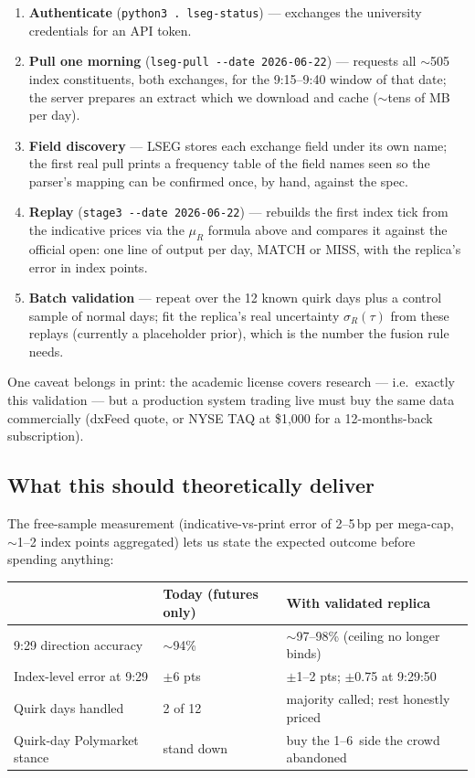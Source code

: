 \documentclass[11pt,a4paper]{article}
\begin{document}
\begin{enumerate}
\item \textbf{Authenticate} (\texttt{python3 . lseg-status}) --- exchanges the
university credentials for an API token.
\item \textbf{Pull one morning} (\texttt{lseg-pull -{}-date 2026-06-22}) ---
requests all $\sim$505 index constituents, both exchanges, for the 9:15--9:40
window of that date; the server prepares an extract which we download and
cache ($\sim$tens of MB per day).
\item \textbf{Field discovery} --- LSEG stores each exchange field under its
own name; the first real pull prints a frequency table of the field names seen
so the parser's mapping can be confirmed once, by hand, against the spec.
\item \textbf{Replay} (\texttt{stage3 -{}-date 2026-06-22}) --- rebuilds the
first index tick from the indicative prices via the $\mu_R$ formula above and
compares it against the official open: one line of output per day, MATCH or
MISS, with the replica's error in index points.
\item \textbf{Batch validation} --- repeat over the 12 known quirk days plus a
control sample of normal days; fit the replica's real uncertainty
$\sigma_R(\tau)$ from these replays (currently a placeholder prior), which is
the number the fusion rule needs.
\end{enumerate}

One caveat belongs in print: the academic license covers research --- i.e.\
exactly this validation --- but a production system trading live must buy the
same data commercially (dxFeed quote, or NYSE TAQ at \$1{,}000 for a
12-months-back subscription).

\subsection{What this should theoretically deliver}

The free-sample measurement (indicative-vs-print error of 2--5\,bp per
mega-cap, $\sim$1--2 index points aggregated) lets us state the expected
outcome before spending anything:

\begin{center}
\begin{tabular}{lll}
\toprule
 & Today (futures only) & With validated replica \\
\midrule
9:29 direction accuracy & $\sim$94\% & $\sim$97--98\% (ceiling no longer binds) \\
Index-level error at 9:29 & $\pm$6 pts & $\pm$1--2 pts; $\pm$0.75 at 9:29:50 \\
Quirk days handled & 2 of 12 & majority called; rest honestly priced \\
Quirk-day Polymarket stance & stand down & buy the 1--6\textcent\ side the crowd abandoned \\
\bottomrule
\end{tabular}
\end{center}
\end{document}
